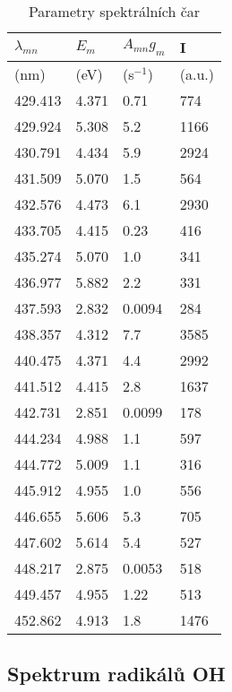 \documentclass[a4paper,11pt]{article}
\begin{document}
\begin{table}[htpb]
\begin{minipage}[b]{.3\linewidth}
\begin{table}[H]
    \vspace{-43pt}
    \small
    \centering
    \begin{tabular}{l l l l}
        $ \lambda_{mn} $ & $ E_m $ & $ A_{mn}g_m $ & I   \\ \hline
        (nm) & (eV) & (s$ ^{-1} $) & (a.u.) \\ \hline\hline
        429.413 & 4.371 & 0.71   &  774 \\
        429.924 & 5.308 & 5.2    & 1166 \\
        430.791 & 4.434 & 5.9    & 2924 \\
        431.509 & 5.070 & 1.5    &  564 \\
        432.576 & 4.473 & 6.1    & 2930 \\
        433.705 & 4.415 & 0.23   &  416 \\
        435.274 & 5.070 & 1.0    &  341 \\
        436.977 & 5.882 & 2.2    &  331 \\
        437.593 & 2.832 & 0.0094 &  284 \\
        438.357 & 4.312 & 7.7    & 3585 \\
        440.475 & 4.371 & 4.4    & 2992 \\
        441.512 & 4.415 & 2.8    & 1637 \\
        442.731 & 2.851 & 0.0099 &  178 \\
        444.234 & 4.988 & 1.1    &  597 \\
        444.772 & 5.009 & 1.1    &  316 \\
        445.912 & 4.955 & 1.0    &  556 \\
        446.655 & 5.606 & 5.3    &  705 \\
        447.602 & 5.614 & 5.4    &  527 \\
        448.217 & 2.875 & 0.0053 &  518 \\
        449.457 & 4.955 & 1.22   &  513 \\
        452.862 & 4.913 & 1.8    & 1476 \\
    \end{tabular}
    \caption{Parametry spektrálních čar}
\end{table}

    \end{minipage} 
\end{table}

\subsection{Spektrum radikálů OH}
\end{document}
